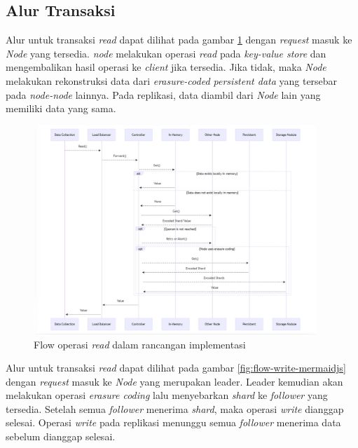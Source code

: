 \subsection{Alur Transaksi}
\label{subsection:system-flow}

Alur untuk transaksi \textit{read} dapat dilihat pada gambar \ref{fig:flow-read-mermaidjs} dengan \textit{request} masuk ke \textit{Node} yang tersedia. \textit{node} melakukan operasi \textit{read} pada \textit{key-value store} dan mengembalikan hasil operasi ke \textit{client} jika tersedia. Jika tidak, maka \textit{Node} melakukan rekonstruksi data dari \textit{erasure-coded persistent data} yang tersebar pada \textit{node-node} lainnya. Pada replikasi, data diambil dari \textit{Node} lain yang memiliki data yang sama.

\begin{figure}[!ht]
    \centering
    \includegraphics[width=0.95\textwidth]{resources/chapter-3/flow-read-mermaidjs.png}
    \caption{Flow operasi \textit{read} dalam rancangan implementasi}
    \label{fig:flow-read-mermaidjs}
\end{figure}

Alur untuk transaksi \textit{read} dapat dilihat pada gambar \ref{fig:flow-write-mermaidjs} dengan \textit{request} masuk ke \textit{Node} yang merupakan leader. Leader kemudian akan melakukan operasi \textit{erasure coding} lalu menyebarkan \textit{shard} ke \textit{follower} yang tersedia. Setelah semua \textit{follower} menerima \textit{shard}, maka operasi \textit{write} dianggap selesai. Operasi \textit{write} pada replikasi menunggu semua \textit{follower} menerima data sebelum dianggap selesai. 

